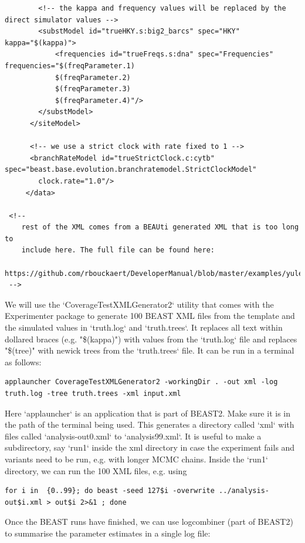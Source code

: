 \documentclass[oneside]{article}
\begin{document}
{\begin{lstlisting}
        <!-- the kappa and frequency values will be replaced by the direct simulator values -->
        <substModel id="trueHKY.s:big2_barcs" spec="HKY" kappa="$(kappa)">
            <frequencies id="trueFreqs.s:dna" spec="Frequencies" frequencies="$(freqParameter.1) 
            $(freqParameter.2) 
            $(freqParameter.3) 
            $(freqParameter.4)"/>
        </substModel>
      </siteModel> 
      
      <!-- we use a strict clock with rate fixed to 1 -->
	  <branchRateModel id="trueStrictClock.c:cytb" spec="beast.base.evolution.branchratemodel.StrictClockModel" 
	  	clock.rate="1.0"/>
     </data>
 
 <!--
 	rest of the XML comes from a BEAUti generated XML that is too long to
 	include here. The full file can be found here:
	https://github.com/rbouckaert/DeveloperManual/blob/master/examples/yule/input.xml
 -->

\end{lstlisting}
}

We will use the `CoverageTestXMLGenerator2` utility that comes with the Experimenter package to generate 100 BEAST XML files from the template and the simulated values in `truth.log` and `truth.trees`. It replaces all text within dollared braces (e.g. "\$(kappa)") with values from the `truth.log` file and replaces "\$(tree)" with newick trees from the `truth.trees` file. 
It can be run in a terminal as follows:

{\scriptsize
\begin{lstlisting}
applauncher CoverageTestXMLGenerator2 -workingDir . -out xml -log truth.log -tree truth.trees -xml input.xml 
\end{lstlisting}
}

Here `applauncher` is an application that is part of BEAST2. Make sure it is in the path of the terminal being used.
This generates a directory called `xml` with files called `analysis-out0.xml` to `analysis99.xml`.
It is useful to make a subdirectory, say `run1` inside the xml directory in case the experiment fails and variants need to be run, e.g. with longer MCMC chains.
Inside the `run1` directory, we can run the 100 XML files, e.g. using

{\scriptsize
\begin{lstlisting}
for i in  {0..99}; do beast -seed 127$i -overwrite ../analysis-out$i.xml > out$i 2>&1 ; done 
\end{lstlisting}
}

Once the BEAST runs have finished, we can use logcombiner (part of BEAST2) to summarise the parameter estimates in a single log file:
\end{document}
